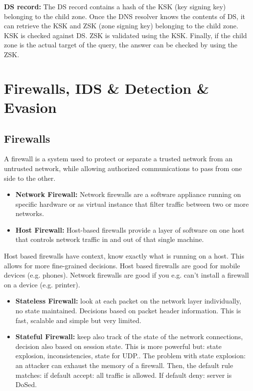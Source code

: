 \documentclass[11pt,oneside,a4paper]{article}
\begin{document}
\textbf{DS record:} The DS record contains a hash of the KSK (key signing key) belonging to the
child zone. Once the DNS resolver knows the contents of DS, it can retrieve the KSK and ZSK (zone
signing key) belonging to the child zone. KSK is checked against DS. ZSK is validated using
the KSK. Finally, if the child zone is the actual target of the query, the answer
can be checked by using the ZSK.

\newpage

\section{Firewalls, IDS \& Detection \& Evasion}

\subsection{Firewalls}

A firewall is a system used to protect or separate a trusted network from an untrusted network, while allowing authorized communications to pass from one side to the other.

\vspace{-\topsep}
\begin{itemize}
	\setlength{\itemsep}{0pt}
	\setlength{\parskip}{0pt}
	\item \textbf{Network Firewall:} Network firewalls are a software appliance running on specific hardware or as virtual instance that filter traffic between two or more networks.
	\item \textbf{Host Firewall:} Host-based firewalls provide a layer of software on one host that controls network traffic in and out of	that single machine.
\end{itemize}
\vspace{-\topsep}

Host based firewalls have context, know exactly what is running on a host. This allows for more fine-grained decisions. Host based firewalls are good for mobile devices (e.g. phones). Network firewalls are good if you e.g. can't install a firewall on a device (e.g. printer).\\

\vspace{-\topsep}
\begin{itemize}
	\setlength{\itemsep}{0pt}
	\setlength{\parskip}{0pt}
	\item \textbf{Stateless Firewall:} look at each packet on the network layer individually, no state maintained. Decisions based on packet header information. This is fast, scalable and simple but very limited.
	\item \textbf{Stateful Firewall:} keep also track of the state of the network connections, decision also based on session state. This is more powerful but: state explosion, inconsistencies, state for UDP.. The problem with state explosion: an attacker can exhaust the memory of a firewall. Then, the default rule matches: if default accept: all traffic is allowed. If default deny: server is DoSed.
\end{itemize}
\vspace{-\topsep}
\end{document}
